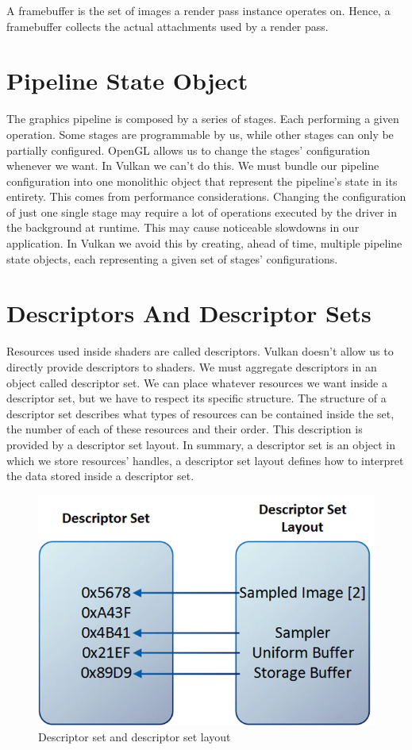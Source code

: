A framebuffer is the set of images a render pass instance operates on.
Hence, a framebuffer collects the actual attachments used by a render pass.

\section{Pipeline State Object}

The graphics pipeline is composed by a series of stages.
Each performing a given operation.
Some stages are programmable by us, while other stages can only be
partially configured.
OpenGL allows us to change the stages' configuration whenever we want.
In Vulkan we can't do this.
We must bundle our pipeline configuration into one monolithic object
that represent the pipeline's state in its entirety.
This comes from performance considerations.
Changing the configuration of just one single stage may require a lot of
operations executed by the driver in the background at runtime.
This may cause noticeable slowdowns in our application.
In Vulkan we avoid this by creating, ahead of time, multiple pipeline state
objects, each representing a given set of stages' configurations.

\section{Descriptors And Descriptor Sets}

Resources used inside shaders are called descriptors.
Vulkan doesn't allow us to directly provide descriptors to shaders.
We must aggregate descriptors in an object called descriptor set.
We can place whatever resources we want inside a descriptor set,
but we have to respect its specific structure.
The structure of a descriptor set describes what types of resources
can be contained inside the set, the number of each of these resources and
their order.
This description is provided by a descriptor set layout.
In summary, a descriptor set is an object in which we store resources' handles,
a descriptor set layout defines how to interpret the data stored inside a
descriptor set.

\begin{figure}[H]
    \centering
    \includegraphics[scale=0.30]{images/ApVulkanConcepts/DescriptorSetAndSetLayout.png}
    \caption{Descriptor set and descriptor set layout}
    \label{fig::DescriptorSetAndSetLaytout}
\end{figure}
